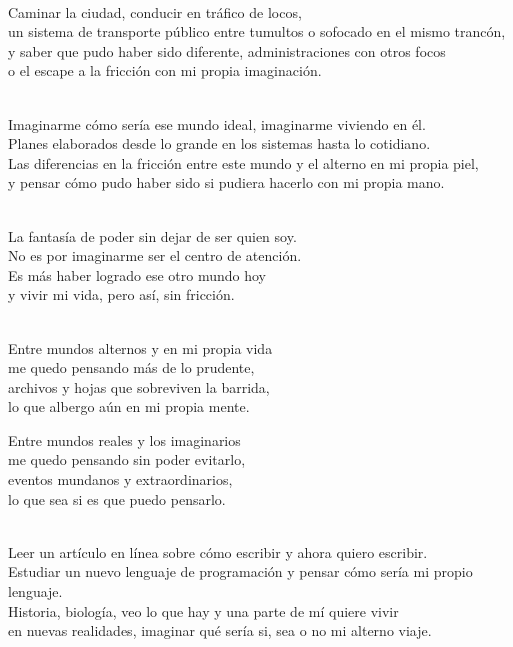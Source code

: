 \begin{lyrics}
\\
Caminar la ciudad, conducir en tráfico de locos,\\
un sistema de transporte público entre tumultos o sofocado en el mismo trancón,\\
y saber que pudo haber sido diferente, administraciones con otros focos\\
o el escape a la fricción con mi propia imaginación.

\\
Imaginarme cómo sería ese mundo ideal, imaginarme viviendo en él.\\
Planes elaborados desde lo grande en los sistemas hasta lo cotidiano.\\
Las diferencias en la fricción entre este mundo y el alterno en mi propia piel,\\
y pensar cómo pudo haber sido si pudiera hacerlo con mi propia mano.

\\
La fantasía de poder sin dejar de ser quien soy.\\
No es por imaginarme ser el centro de atención.\\
Es más haber logrado ese otro mundo hoy\\
y vivir mi vida, pero así, sin fricción.

\\
Entre mundos alternos y en mi propia vida\\
me quedo pensando más de lo prudente,\\
archivos y hojas que sobreviven la barrida,\\
lo que albergo aún en mi propia mente.

Entre mundos reales y los imaginarios\\
me quedo pensando sin poder evitarlo,\\
eventos mundanos y extraordinarios,\\
lo que sea si es que puedo pensarlo.

\\
Leer un artículo en línea sobre cómo escribir y ahora quiero escribir.\\
Estudiar un nuevo lenguaje de programación y pensar cómo sería mi propio lenguaje.\\
Historia, biología, veo lo que hay y una parte de mí quiere vivir\\
en nuevas realidades, imaginar qué sería si, sea o no mi alterno viaje.


\end{lyrics}
